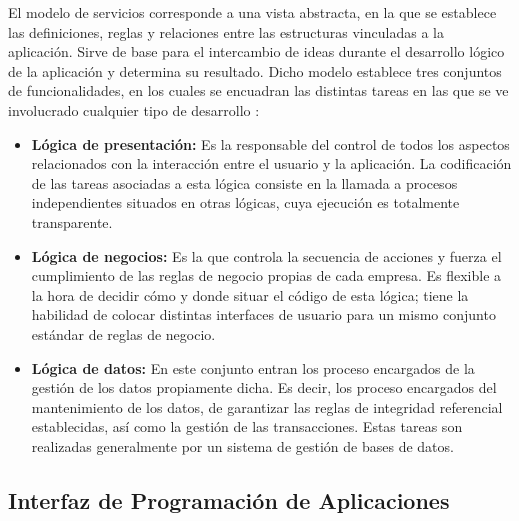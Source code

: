El modelo de servicios corresponde a una vista abstracta, en la que se establece las definiciones, reglas y relaciones entre las estructuras vinculadas a la aplicación. Sirve de base para el intercambio de ideas durante el desarrollo lógico de la aplicación y determina su resultado. Dicho modelo establece tres conjuntos de funcionalidades, en los cuales se encuadran las distintas tareas en las que se ve involucrado cualquier tipo de desarrollo \parencite{marini2012}:

\begin{itemize}
\item \textbf{Lógica de presentación:} Es la responsable del control de todos los aspectos relacionados con la interacción entre el usuario y la aplicación. La codificación de las tareas asociadas a esta lógica consiste en la llamada a procesos independientes situados en otras lógicas, cuya ejecución es totalmente transparente.
\item \textbf{Lógica de negocios:} Es la que controla la secuencia de acciones y fuerza el cumplimiento de las reglas de negocio propias de cada empresa. Es flexible a la hora de decidir cómo y donde situar el código de esta lógica; tiene la habilidad de colocar distintas interfaces de usuario para un mismo conjunto estándar de reglas de negocio.

\item \textbf{Lógica de datos:} En este conjunto entran los proceso encargados de la gestión de los datos propiamente dicha. Es decir, los proceso encargados del mantenimiento de los datos, de garantizar las reglas de integridad referencial establecidas, así como la gestión de las transacciones. Estas tareas son realizadas generalmente por un sistema de gestión de bases de datos.
\end{itemize}

\subsection{Interfaz de Programación de Aplicaciones}

